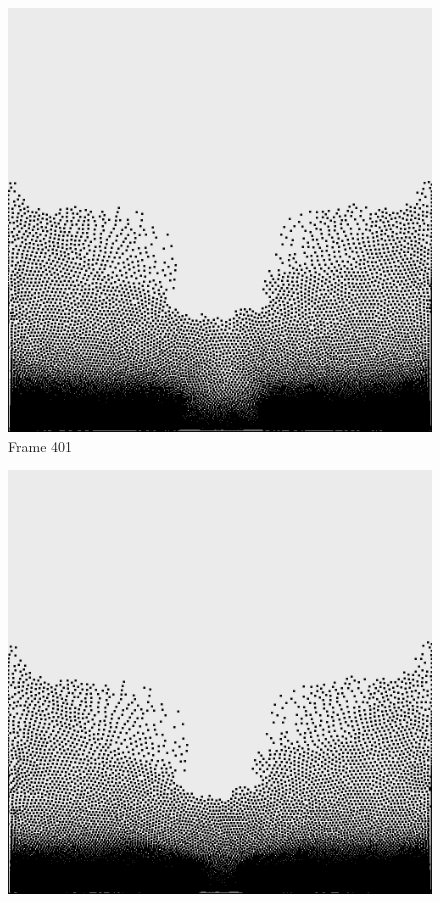 \documentclass[a4paper, 12pt, oneside]{book}
\begin{document}
\begin{figure}[!ht]
        \begin{center}
            \includegraphics[width=\linewidth]{images/test_case_1/401.png}
            Frame 401
        \end{center}
    \endminipage
    \hfill
        \begin{center}
            \includegraphics[width=\linewidth]{images/test_case_1/421.png}

\end{center}
\end{figure}
\end{document}
